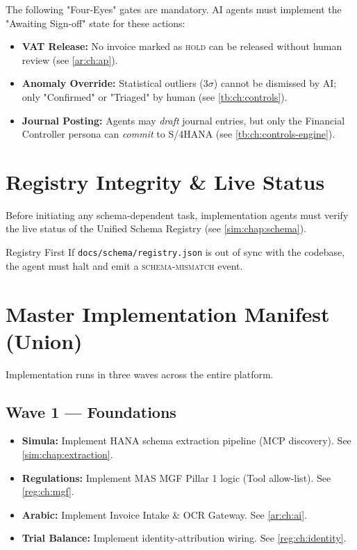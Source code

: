 \documentclass[11pt,a4paper,twoside]{report}
\begin{document}
The following "Four-Eyes" gates are mandatory. AI agents must implement the "Awaiting Sign-off" state for these actions:
\begin{itemize}
\item \textbf{VAT Release:} No invoice marked as \textsc{hold} can be released without human review (see \cref{ar:ch:ap}).
\item \textbf{Anomaly Override:} Statistical outliers ($3\sigma$) cannot be dismissed by AI; only "Confirmed" or "Triaged" by human (see \cref{tb:ch:controls}).
\item \textbf{Journal Posting:} Agents may \emph{draft} journal entries, but only the Financial Controller persona can \emph{commit} to S/4HANA (see \cref{tb:ch:controls-engine}).
\end{itemize}

\section{Registry Integrity \& Live Status}
\label{sec:registry-integrity}

Before initiating any schema-dependent task, implementation agents must verify the live status of the Unified Schema Registry (see \cref{sim:chap:schema}).
\begin{adrbox}{Registry First}
If \texttt{docs/schema/registry.json} is out of sync with the codebase, the agent must halt and emit a \textsc{schema-mismatch} event.
\end{adrbox}

\section{Master Implementation Manifest (Union)}
Implementation runs in three waves across the entire platform.

\subsection*{Wave 1 --- Foundations}
\begin{itemize}
\item \textbf{Simula:} Implement HANA schema extraction pipeline (MCP discovery). See \cref{sim:chap:extraction}.
\item \textbf{Regulations:} Implement MAS MGF Pillar 1 logic (Tool allow-list). See \cref{reg:ch:mgf}.
\item \textbf{Arabic:} Implement Invoice Intake \& OCR Gateway. See \cref{ar:ch:ai}.
\item \textbf{Trial Balance:} Implement identity-attribution wiring. See \cref{reg:ch:identity}.
\end{itemize}
\end{document}

